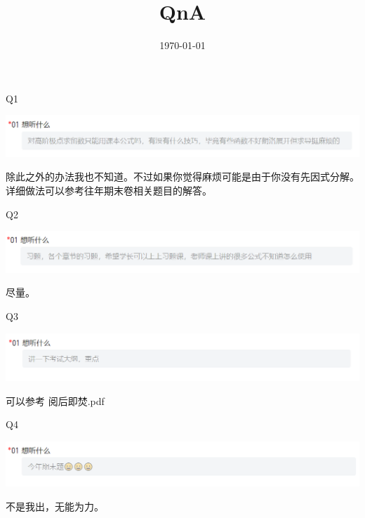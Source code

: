 \documentclass{beamer}
\title{QnA}
\date{\today}
\begin{document}
\begin{frame}
    \titlepage
\end{frame}



\begin{frame}{Q1}
    \begin{center}
        \includegraphics[width=1.0\textwidth]{figures/q1.png} %
    \end{center}
    除此之外的办法我也不知道。不过如果你觉得麻烦可能是由于你没有先因式分解。详细做法可以参考往年期末卷相关题目的解答。

\end{frame}

\begin{frame}{Q2}
    \begin{center}
        \includegraphics[width=1.0\textwidth]{figures/q2.png} %
    \end{center}
    尽量。

\end{frame}

\begin{frame}{Q3}
    \begin{center}
        \includegraphics[width=1.0\textwidth]{figures/q3.png} %
    \end{center}
    可以参考 阅后即焚.pdf

\end{frame}

\begin{frame}{Q4}
    \begin{center}
        \includegraphics[width=1.0\textwidth]{figures/q4.png} %
    \end{center}
    不是我出，无能为力。

\end{frame}
\end{document}
